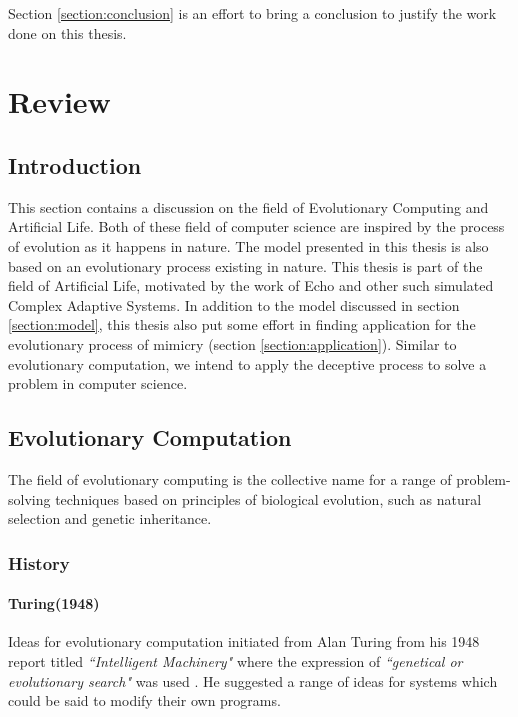 \documentclass[letterpaper]{article}
\numberwithin{equation}{section}
\begin{document}
Section \ref{section:conclusion} is an effort to bring a conclusion to justify the work done on this thesis. 

\section{Review}
\label{section:review}
\subsection{Introduction}

This section contains a discussion on the field of Evolutionary Computing and Artificial Life. Both of these field of computer science are inspired by the process of evolution as it happens in nature. The model presented in this thesis is also based on an evolutionary process existing in nature. This thesis is part of the field of Artificial Life, motivated by the work of Echo \cite{holland1996} and other such simulated Complex Adaptive Systems. In addition to the model discussed in section \ref{section:model}, this thesis also put some effort in finding application for the evolutionary process of mimicry (section \ref{section:application}). Similar to evolutionary computation, we intend to apply the deceptive process to solve a problem in computer science.

\subsection{Evolutionary Computation}
The field of evolutionary computing is the collective name for a range of problem-solving techniques based on principles of biological evolution, such as natural selection and genetic inheritance. 

\subsubsection{History}
\label{subsubsec:evo-comp-history}

\paragraph{Turing(1948)}
Ideas for evolutionary computation initiated from Alan Turing from his 1948 report titled \textsl{``Intelligent Machinery"} where the expression of \textsl{``genetical or evolutionary search"}  was used \cite{turing1948}. He suggested a range of ideas for systems which could be said to modify their own programs. 
\end{document}
